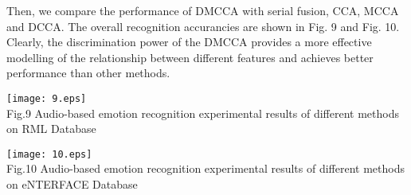 \documentclass[journal]{IEEEtran}
\begin{document}
Then, we compare the performance of DMCCA with serial fusion, CCA, MCCA and DCCA. The overall recognition accurancies are shown in Fig. 9 and Fig. 10. Clearly, the discrimination power of the DMCCA provides a more effective modelling of the relationship between different features and achieves better performance than other methods.
\begin{figure*}[t]
\centering
\texttt{[image: 9.eps]}\\ Fig.9 Audio-based emotion recognition experimental results of different methods on RML Database\\
\end{figure*}
\begin{figure*}[t]
\centering
\texttt{[image: 10.eps]}\\ Fig.10 Audio-based emotion recognition experimental results of different methods on eNTERFACE Database\\
\end{figure*}


\end{document}

